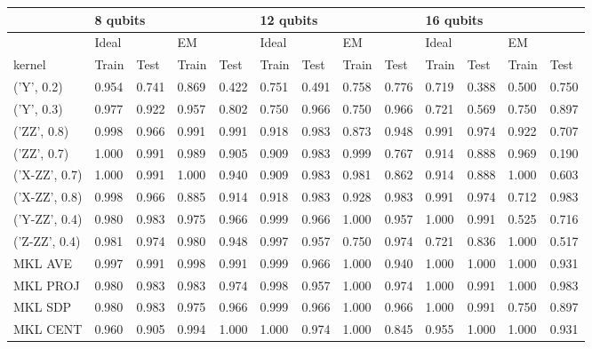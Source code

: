 \documentclass[reprint,amsfonts, amssymb, amsmath,  showkeys, nofootinbib,pra, superscriptaddress, twocolumn,longbibliography]{revtex4-2}
\begin{document}
\begin{table*}
    \centering
    \begin{tabular}{|l|l|l|l|l|l|l|l|l|l|l|l|l|}
    \hline
        ~ & \multicolumn{4}{l|}{8 qubits} & \multicolumn{4}{l|}{12 qubits} & \multicolumn{4}{l|}{16 qubits} \\ \hline
        ~ & \multicolumn{2}{l|}{Ideal} & \multicolumn{2}{l|}{EM} & \multicolumn{2}{l|}{Ideal} & \multicolumn{2}{l|}{EM} & \multicolumn{2}{l|}{Ideal} & \multicolumn{2}{l|}{EM} \\ \hline
        kernel & Train & Test & Train & Test & Train & Test & Train & Test & Train & Test & Train & Test \\ \hline
        ('Y', 0.2) & 0.954 & 0.741 & 0.869 & 0.422 & 0.751 & 0.491 & 0.758 & 0.776 & 0.719 & 0.388 & 0.500 & 0.750 \\ \hline
        ('Y', 0.3) & 0.977 & 0.922 & 0.957 & 0.802 & 0.750 & 0.966 & 0.750 & 0.966 & 0.721 & 0.569 & 0.750 & 0.897 \\ \hline
        ('ZZ', 0.8) & 0.998 & 0.966 & 0.991 & 0.991 & 0.918 & 0.983 & 0.873 & 0.948 & 0.991 & 0.974 & 0.922 & 0.707 \\ \hline
        ('ZZ', 0.7) & 1.000 & 0.991 & 0.989 & 0.905 & 0.909 & 0.983 & 0.999 & 0.767 & 0.914 & 0.888 & 0.969 & 0.190 \\ \hline
        ('X-ZZ', 0.7) & 1.000 & 0.991 & 1.000 & 0.940 & 0.909 & 0.983 & 0.981 & 0.862 & 0.914 & 0.888 & 1.000 & 0.603 \\ \hline
        ('X-ZZ', 0.8) & 0.998 & 0.966 & 0.885 & 0.914 & 0.918 & 0.983 & 0.928 & 0.983 & 0.991 & 0.974 & 0.712 & 0.983 \\ \hline
        ('Y-ZZ', 0.4) & 0.980 & 0.983 & 0.975 & 0.966 & 0.999 & 0.966 & 1.000 & 0.957 & 1.000 & 0.991 & 0.525 & 0.716 \\ \hline
        ('Z-ZZ', 0.4) & 0.981 & 0.974 & 0.980 & 0.948 & 0.997 & 0.957 & 0.750 & 0.974 & 0.721 & 0.836 & 1.000 & 0.517 \\ \hline
        MKL AVE & 0.997 & 0.991 & 0.998 & 0.991 & 0.999 & 0.966 & 1.000 & 0.940 & 1.000 & 1.000 & 1.000 & 0.931 \\ \hline
        MKL PROJ & 0.980 & 0.983 & 0.983 & 0.974 & 0.998 & 0.957 & 1.000 & 0.974 & 1.000 & 0.991 & 1.000 & 0.983 \\ \hline
        MKL SDP & 0.980 & 0.983 & 0.975 & 0.966 & 0.999 & 0.966 & 1.000 & 0.966 & 1.000 & 0.991 & 0.750 & 0.897 \\ \hline
        MKL CENT & 0.960 & 0.905 & 0.994 & 1.000 & 1.000 & 0.974 & 1.000 & 0.845 & 0.955 & 1.000 & 1.000 & 0.931 \\ \hline

\end{tabular}
\end{table*}
\end{document}
